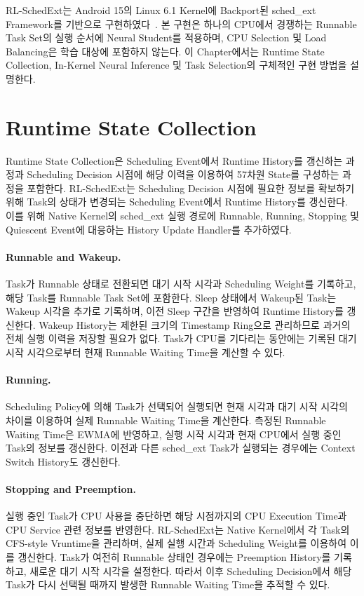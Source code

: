 \label{sec:implementation}

RL-SchedExt는 Android 15의 Linux 6.1 Kernel에 Backport된 sched\_ext Framework를 기반으로 구현하였다~\cite{pixelkernel,schedext}.
본 구현은 하나의 CPU에서 경쟁하는 Runnable Task Set의 실행 순서에 Neural Student를 적용하며, CPU Selection 및 Load Balancing은 학습 대상에 포함하지 않는다.
이 Chapter에서는 Runtime State Collection, In-Kernel Neural Inference 및 Task Selection의 구체적인 구현 방법을 설명한다.

\section{Runtime State Collection}
\label{sec:runtime_state_collection}

Runtime State Collection은 Scheduling Event에서 Runtime History를 갱신하는 과정과 Scheduling Decision 시점에 해당 이력을 이용하여 57차원 State를 구성하는 과정을 포함한다.
RL-SchedExt는 Scheduling Decision 시점에 필요한 정보를 확보하기 위해
Task의 상태가 변경되는 Scheduling Event에서 Runtime History를 갱신한다.
이를 위해 Native Kernel의 sched\_ext 실행 경로에
Runnable, Running, Stopping 및 Quiescent Event에 대응하는
History Update Handler를 추가하였다.

\paragraph{Runnable and Wakeup.}
Task가 Runnable 상태로 전환되면 대기 시작 시각과
Scheduling Weight를 기록하고, 해당 Task를 Runnable Task Set에
포함한다. Sleep 상태에서 Wakeup된 Task는 Wakeup 시각을
추가로 기록하며, 이전 Sleep 구간을 반영하여 Runtime History를
갱신한다. Wakeup History는 제한된 크기의 Timestamp Ring으로
관리하므로 과거의 전체 실행 이력을 저장할 필요가 없다.
Task가 CPU를 기다리는 동안에는 기록된 대기 시작 시각으로부터
현재 Runnable Waiting Time을 계산할 수 있다.

\paragraph{Running.}
Scheduling Policy에 의해 Task가 선택되어 실행되면
현재 시각과 대기 시작 시각의 차이를 이용하여
실제 Runnable Waiting Time을 계산한다.
측정된 Runnable Waiting Time은 EWMA에 반영하고, 실행 시작 시각과 현재 CPU에서 실행 중인
Task의 정보를 갱신한다.
이전과 다른 sched\_ext Task가 실행되는 경우에는
Context Switch History도 갱신한다.

\paragraph{Stopping and Preemption.}
실행 중인 Task가 CPU 사용을 중단하면 해당 시점까지의
CPU Execution Time과 CPU Service 관련 정보를 반영한다.
RL-SchedExt는 Native Kernel에서 각 Task의 CFS-style Vruntime을 관리하며,
실제 실행 시간과 Scheduling Weight를 이용하여 이를 갱신한다.
Task가 여전히 Runnable 상태인 경우에는 Preemption History를
기록하고, 새로운 대기 시작 시각을 설정한다.
따라서 이후 Scheduling Decision에서 해당 Task가 다시 선택될 때까지
발생한 Runnable Waiting Time을 추적할 수 있다.

